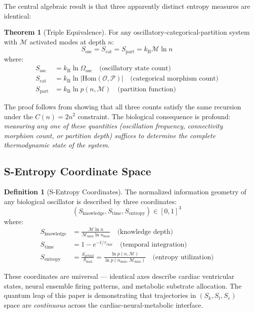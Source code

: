 \documentclass[12pt,a4paper]{article}
\theoremstyle{definition}
\newtheorem{theorem}{Theorem}
\newtheorem{definition}{Definition}
\newcommand{\SE}{S_{\text{entropy}}}
\newcommand{\SK}{S_{\text{knowledge}}}
\newcommand{\ST}{S_{\text{time}}}
\newcommand{\Sosc}{S_{\text{osc}}}
\newcommand{\Scat}{S_{\text{cat}}}
\newcommand{\Spart}{S_{\text{part}}}
\newcommand{\kB}{k_{\text{B}}}
\newcommand{\calO}{\mathcal{O}}
\newcommand{\calP}{\mathcal{P}}
\begin{document}
The central algebraic result is that three apparently distinct entropy measures
are identical:

\begin{theorem}[Triple Equivalence]
\label{thm:triple}
For any oscillatory-categorical-partition system with $\mathcal{M}$ activated modes
at depth $n$:
\begin{equation}
\boxed{\Sosc = \Scat = \Spart = \kB \mathcal{M} \ln n}
\end{equation}
where:
\begin{align}
\Sosc &= \kB \ln \Omega_{\text{osc}} \quad \text{(oscillatory state count)}\\
\Scat &= \kB \ln |\text{Hom}(\calO, \calP)| \quad \text{(categorical morphism count)}\\
\Spart &= \kB \ln p(n, \mathcal{M}) \quad \text{(partition function)}
\end{align}
\end{theorem}

The proof follows from showing that all three counts satisfy the same recursion
under the $C(n) = 2n^2$ constraint. The biological consequence is profound:
\emph{measuring any one of these quantities (oscillation frequency, connectivity
morphism count, or partition depth) suffices to determine the complete thermodynamic
state of the system.}

\subsection{S-Entropy Coordinate Space}

\begin{definition}[S-Entropy Coordinates]
The normalized information geometry of any biological oscillator is described
by three coordinates:
\begin{equation}
(\SK, \ST, \SE) \in [0,1]^3
\end{equation}
where:
\begin{align}
\SK &= \frac{\mathcal{M} \ln n}{\mathcal{M}_{\max} \ln n_{\max}} \quad \text{(knowledge depth)}\\
\ST &= 1 - e^{-t/\tau_{\text{char}}} \quad \text{(temporal integration)}\\
\SE &= \frac{S_{\text{actual}}}{S_{\max}} = \frac{\ln p(n, \mathcal{M})}{\ln p(n_{\max}, \mathcal{M}_{\max})} \quad \text{(entropy utilization)}
\end{align}
\end{definition}

These coordinates are universal — identical axes describe cardiac ventricular
states, neural ensemble firing patterns, and metabolic substrate allocation.
The quantum leap of this paper is demonstrating that trajectories in
$(S_k, S_t, S_e)$ space are \emph{continuous} across the cardiac-neural-metabolic
interface.
\end{document}
